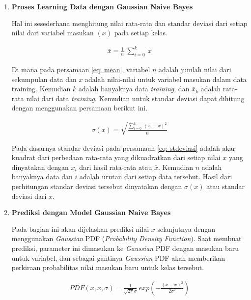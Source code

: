 \begin{subs}
\begin{enumerate}[label=\textbf{\arabic*).}]
		\item \textbf{Proses Learning Data dengan Gaussian Naive Bayes}
		
		Hal ini sesederhana menghitung nilai rata-rata dan standar deviasi dari setiap nilai dari variabel masukan $(x)$ pada setiap kelas.
		
		\begin{equation}\label{eq: mean}
		\begin{split}
		\bar x = \frac{1}{n}\ \sum_{i=0}^{k}\ x
		\end{split}
		\end{equation}
		
		Di mana pada persamaan \ref{eq: mean}, variabel $n$ adalah jumlah nilai dari sekumpulan data dan $x$ adalah nilai-nilai untuk variabel masukan dalam data training. Kemudian $k$ adalah banyaknya data \textit{training}, dan $\bar x_{k}$ adalah rata-rata nilai dari data \textit{training}. Kemudian untuk standar deviasi dapat dihitung dengan menggunakan persamaan berikut ini.
		
		\begin{equation}\label{eq: stdeviasi}
		\begin{split}
		\sigma(x) = \sqrt{\frac{\sum_{i = 0}^{k}\ (x_{i} - \bar{x})^{2}}{n}}
		\end{split}
		\end{equation}
		
		Pada dasarnya standar deviasi pada persamaan \ref{eq: stdeviasi} adalah akar kuadrat dari perbedaan rata-rata yang dikuadratkan dari setiap nilai $x$ yang dinyatakan dengan $x_{i}$ dari hasil rata-rata atau $\bar x$. Kemudian $n$ adalah banyaknya data dan $i$ adalah urutan dari setiap data tersebut. Hasil dari perhitungan standar deviasi tersebut dinyatakan dengan $\sigma(x)$ atau standar deviasi dari $x$.
	
		\item \textbf{Prediksi dengan Model Gaussian Naive Bayes}
	
		Pada bagian ini akan dijelaskan prediksi nilai $x$ selanjutnya dengan menggunakan \textit{Gaussian} PDF (\textit{Probability Density Function}). Saat membuat prediksi, parameter ini dimasukan ke \textit{Gaussian} PDF dengan masukan baru untuk variabel, dan sebagai gantinya \textit{Gaussian} PDF akan memberikan perkiraan probabilitas nilai masukan baru untuk kelas tersebut.
		
		\begin{equation}\label{eq: nbayes_gaus_pdf}
		\begin{split}
		PDF(x, \bar{x}, \sigma) = \frac{1}{\sqrt{2 \pi} \sigma}\ exp \left(-\frac{(x - \bar{x})^2}{2 \sigma^2}\right)
		\end{split}
		\end{equation}
		

\end{enumerate}
\end{subs}
